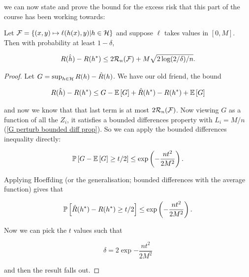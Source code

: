 \documentclass[11pt]{scrartcl}
\begin{document}

we can now state and prove the bound for the excess risk that this part of the course has been working towards:

\begin{theorem}
\label{ERM with rademacher}
    Let $\F = \{ (x,y) \mapsto \ell(h(x),y) | h \in \H \}$ and suppose $\ell$ takes values in $[0,M]$. Then with probability at least $1-\delta$,
    
    \begin{equation}
        R(\hat{h}) - R(h^*) \le 2\R_n(\F) + M \sqrt{2 \log(2/\delta) / n}.
    \label{bound with rad}
    \end{equation}
    
    \begin{proof}
        Let $G = \sup_{h \in \H} R(h) - \hat{R}(h)$. We have our old friend, the bound
        
        \begin{equation}
            R(\hat{h}) - R(h^*) \le G - \E{G} + \hat{R}(h^*) - R(h^*) + \E{G}
        \end{equation}
        
        and now we know that that last term is at most $2\R_n(\F)$. Now viewing $G$ as a function of all the $Z_i$, it satisfies a bounded differences property with $L_i=M/n$ (\ref{G perturb bounded diff prop}). So we can apply the bounded differences inequality directly:
        
        \begin{equation}
            \P{G - \E{G} \ge t/2} \le \exp{- \frac{nt^2}{2M^2}}.
        \end{equation}
        
        Applying Hoeffding (or the generalisation; bounded differences with the average function) gives that
        
        \begin{equation}
            \P{\hat{R}(h^*) - R(h^*) \ge t/2} \le \exp{- \frac{nt^2}{2M^2}}.
        \end{equation}
        
        Now we can pick the $t$ values such that
        
        \begin{equation}
            \delta = 2 \exp{- \frac{nt^2}{2M^2}}
        \end{equation}
        
        and then the result falls out.
        
    \end{proof}
\end{theorem}
\end{document}

